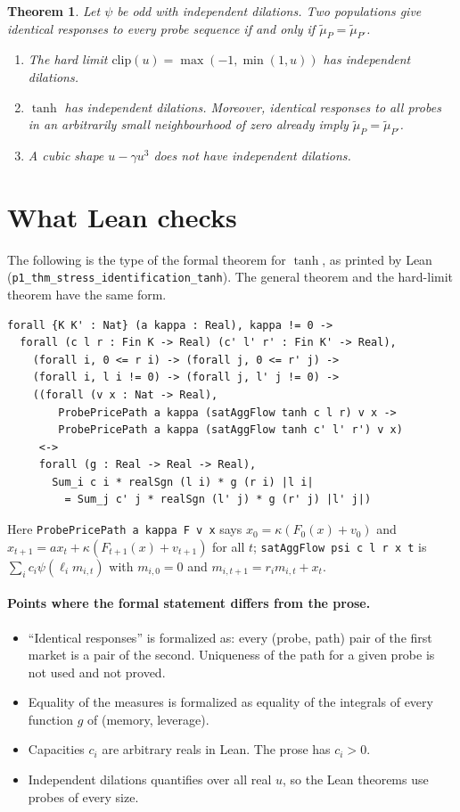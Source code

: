 \documentclass[11pt]{article}
\newtheorem{theorem}{Theorem}
\begin{document}
\begin{theorem}
Let $\psi$ be odd with independent dilations. Two populations give identical responses to every probe sequence if and only if $\tilde\mu_P=\tilde\mu_{P'}$.
\begin{enumerate}[label=(\roman*)]
\item The hard limit $\mathrm{clip}(u)=\max(-1,\min(1,u))$ has independent dilations.
\item $\tanh$ has independent dilations. Moreover, identical responses to all probes in an arbitrarily small neighbourhood of zero already imply $\tilde\mu_P=\tilde\mu_{P'}$.
\item A cubic shape $u-\gamma u^3$ does not have independent dilations.
\end{enumerate}
\end{theorem}

\section{What Lean checks}

The following is the type of the formal theorem for $\tanh$, as printed by Lean (\texttt{p1\_thm\_stress\_identification\_tanh}). The general theorem and the hard-limit theorem have the same form.
{\small
\begin{verbatim}
forall {K K' : Nat} (a kappa : Real), kappa != 0 ->
  forall (c l r : Fin K -> Real) (c' l' r' : Fin K' -> Real),
    (forall i, 0 <= r i) -> (forall j, 0 <= r' j) ->
    (forall i, l i != 0) -> (forall j, l' j != 0) ->
    ((forall (v x : Nat -> Real),
        ProbePricePath a kappa (satAggFlow tanh c l r) v x ->
        ProbePricePath a kappa (satAggFlow tanh c' l' r') v x)
     <->
     forall (g : Real -> Real -> Real),
       Sum_i c i * realSgn (l i) * g (r i) |l i|
         = Sum_j c' j * realSgn (l' j) * g (r' j) |l' j|)
\end{verbatim}}
\noindent Here \texttt{ProbePricePath a kappa F v x} says $x_0=\kappa(F_0(x)+v_0)$ and $x_{t+1}=ax_t+\kappa(F_{t+1}(x)+v_{t+1})$ for all $t$; \texttt{satAggFlow psi c l r x t} is $\sum_ic_i\psi(\ell_im_{i,t})$ with $m_{i,0}=0$ and $m_{i,t+1}=r_im_{i,t}+x_t$.

\paragraph{Points where the formal statement differs from the prose.}
\begin{itemize}[itemsep=1pt]
\item ``Identical responses'' is formalized as: every (probe, path) pair of the first market is a pair of the second. Uniqueness of the path for a given probe is not used and not proved.
\item Equality of the measures is formalized as equality of the integrals of every function $g$ of (memory, leverage).
\item Capacities $c_i$ are arbitrary reals in Lean. The prose has $c_i>0$.
\item Independent dilations quantifies over all real $u$, so the Lean theorems use probes of every size.
\end{itemize}
\end{document}
